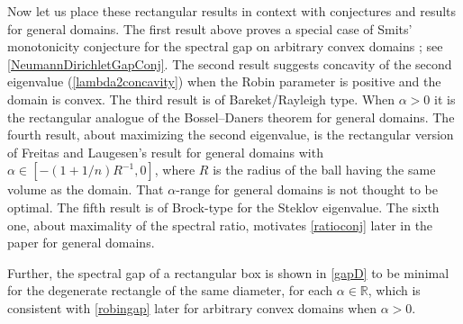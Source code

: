 \documentclass[12pt,reqno]{amsart}
\theoremstyle{definition}
\newcommand{\R}{{\mathbb R}}
\begin{document}
Now let us place these rectangular results in context with conjectures and results for general domains. The first result above proves a special case of Smits' monotonicity conjecture for the spectral gap on arbitrary convex domains \cite[Section 4]{Sm96}; see \autoref{NeumannDirichletGapConj}. The second result suggests concavity of the second eigenvalue (\autoref{lambda2concavity}) when the Robin parameter is positive and the domain is convex. The third result is of Bareket/Rayleigh type. When $\alpha>0$ it is the rectangular analogue of the Bossel--Daners theorem for general domains. The fourth result, about maximizing the second eigenvalue, is the rectangular version of Freitas and Laugesen's result \cite{FL18a} for general domains with $\alpha \in [-(1+1/n)R^{-1},0]$, where $R$ is the radius of the ball having the same volume as the domain. That $\alpha$-range for general domains is not thought to be optimal. The fifth result is of Brock-type for the Steklov eigenvalue. The sixth one, about maximality of the spectral ratio, motivates \autoref{ratioconj} later in the paper for general domains. 

Further, the spectral gap of a rectangular box is shown in \autoref{gapD} to be minimal for the degenerate rectangle of the same diameter, for each $\alpha \in \R$, which is consistent with \autoref{robingap} later for arbitrary convex domains when $\alpha>0$. 
\end{document}
